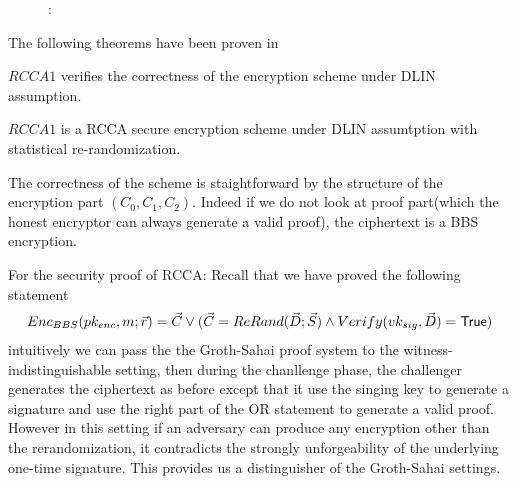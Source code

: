 \begin{description}
\item[]:
  

\end{description}

The following theorems have been proven in~\cite{DBLP:conf/eurocrypt/ChaseKLM12}

\begin{myTh}
  $RCCA1$ verifies the correctness of the encryption scheme under DLIN assumption.
\end{myTh}

\begin{myTh}
  $RCCA1$ is a RCCA secure encryption scheme under DLIN assumtption with statistical re-randomization.
\end{myTh}


The correctness of the scheme is staightforward by the structure of the encryption part $(C_0, C_1, C_2)$.
Indeed if we do not look at proof part(which the honest encryptor can always generate a valid proof), the ciphertext is a BBS~\cite{DBLP:conf/crypto/BonehBS04} encryption.

For the security proof of RCCA:
Recall that we have proved the following statement
\begin{align*} 
  Enc_{BBS}(pk_{enc}, m; \vec{r}) = \vec{C} \vee (\vec{C} = ReRand(\vec{D}; \vec{S}) \wedge Verify(vk_{sig}, \vec{D}) = \mathsf{True})
\end{align*}
intuitively we can pass the the Groth-Sahai proof system to the witness-indistinguishable setting, then during the chanllenge phase,
the challenger generates the ciphertext as before except that it use the singing key to generate a signature and use the right part of the OR statement to generate a valid proof.
However in this setting if an adversary can produce any encryption other than the rerandomization, it contradicts the strongly unforgeability of the underlying one-time signature.
This provides us a distinguisher of the Groth-Sahai settings.
%

